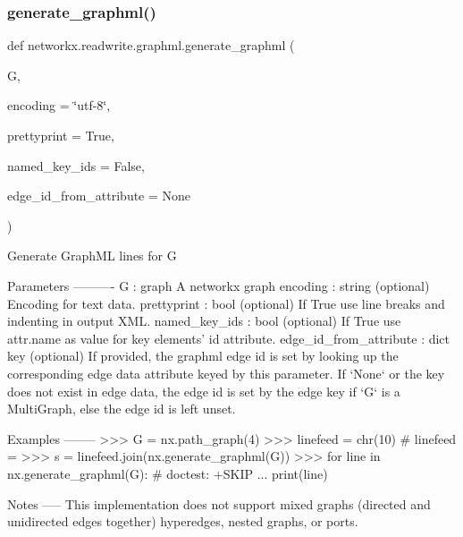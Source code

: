 \subsubsection{\texorpdfstring{generate\+\_\+graphml()}{generate\_graphml()}}
{\footnotesize\ttfamily def networkx.\+readwrite.\+graphml.\+generate\+\_\+graphml (\begin{DoxyParamCaption}\item[{}]{G,  }\item[{}]{encoding = {\ttfamily \char`\"{}utf-\/8\char`\"{}},  }\item[{}]{prettyprint = {\ttfamily True},  }\item[{}]{named\+\_\+key\+\_\+ids = {\ttfamily False},  }\item[{}]{edge\+\_\+id\+\_\+from\+\_\+attribute = {\ttfamily None} }\end{DoxyParamCaption})}

\begin{DoxyVerb}Generate GraphML lines for G

Parameters
----------
G : graph
   A networkx graph
encoding : string (optional)
   Encoding for text data.
prettyprint : bool (optional)
   If True use line breaks and indenting in output XML.
named_key_ids : bool (optional)
   If True use attr.name as value for key elements' id attribute.
edge_id_from_attribute : dict key (optional)
    If provided, the graphml edge id is set by looking up the corresponding
    edge data attribute keyed by this parameter. If `None` or the key does not exist in edge data,
    the edge id is set by the edge key if `G` is a MultiGraph, else the edge id is left unset.

Examples
--------
>>> G = nx.path_graph(4)
>>> linefeed = chr(10)  # linefeed = \n
>>> s = linefeed.join(nx.generate_graphml(G))
>>> for line in nx.generate_graphml(G):  # doctest: +SKIP
...     print(line)

Notes
-----
This implementation does not support mixed graphs (directed and unidirected
edges together) hyperedges, nested graphs, or ports.
\end{DoxyVerb}
 \mbox{\label{namespacenetworkx_1_1readwrite_1_1graphml_abeff394d286bd6994a649c8bdddd5a17}} 
